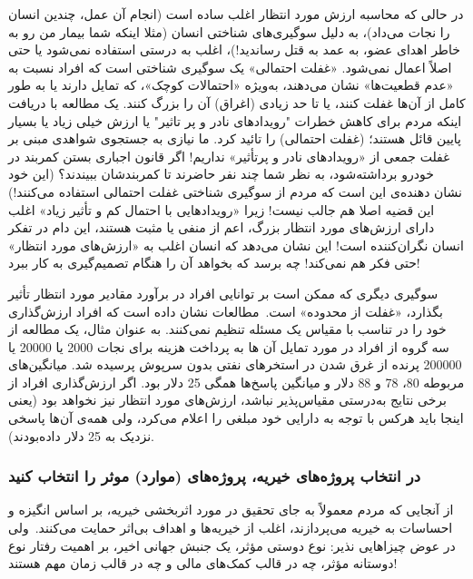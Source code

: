 در حالی که محاسبه ارزش مورد انتظار اغلب ساده است (انجام آن عمل، چندین انسان را نجات می‌داد)، به دلیل سوگیری‌های شناختی انسان (مثلا اینکه شما بیمار من رو به خاطر اهدای عضو، به عمد به قتل رساندید!)، اغلب به درستی استفاده نمی‌شود یا حتی اصلاً اعمال نمی‌شود.
«غفلت احتمالی» یک سوگیری شناختی است که افراد نسبت به «عدم قطعیت‌ها» نشان می‌دهند، به‌ویژه «احتمالات کوچک»، که تمایل دارند یا به طور کامل از آن‌ها غفلت کنند، یا تا حد زیادی (اغراق) آن را بزرگ کنند.
یک مطالعه با دریافت اینکه مردم برای کاهش خطرات "رویدادهای نادر و پر تاثیر" یا ارزش خیلی زیاد یا بسیار پایین قائل هستند؛ (غفلت احتمالی) را تائید کرد.
ما نیازی به جستجوی شواهدی مبنی بر غفلت جمعی از «رویدادهای نادر و پرتأثیر» نداریم!
اگر قانون اجباری بستن کمربند در خودرو برداشته‌شود، به نظر شما چند نفر حاضرند تا کمربندشان ببیندند؟ (این خود نشان دهنده‌ی این است که مردم از سوگیری شناختی غفلت احتمالی استفاده می‌کنند!) این قضیه اصلا هم جالب نیست!
زیرا «رویدادهایی با احتمال کم و تأثیر زیاد» اغلب دارای ارزش‌های مورد انتظار بزرگ، اعم از منفی یا مثبت هستند، این دام در تفکر انسان نگران‌کننده است!
این نشان می‌دهد که انسان اغلب به «ارزش‌های مورد انتظار» حتی فکر هم نمی‌کند!
چه برسد که بخواهد آن را هنگام تصمیم‌گیری به کار ببرد!

سوگیری دیگری که ممکن است بر توانایی افراد در برآورد مقادیر مورد انتظار تأثیر بگذارد، «غفلت از محدوده» است.\     مطالعات نشان داده است که افراد ارزش‌گذاری خود را در تناسب با مقیاس یک مسئله تنظیم نمی‌کنند.
به عنوان مثال، یک مطالعه از سه گروه از افراد در مورد تمایل آن ها به پرداخت هزینه برای نجات 2000 یا 20000 یا 200000 پرنده از غرق شدن در استخرهای نفتی بدون سرپوش پرسیده شد.
میانگین‌های مربوطه 80، 78 و 88 دلار و میانگین پاسخ‌ها همگی 25 دلار بود.
اگر ارزش‌گذاری افراد از برخی نتایج به‌درستی مقیاس‌پذیر نباشد، ارزش‌های مورد انتظار نیز نخواهد بود (یعنی اینجا باید هرکس با توجه به دارایی خود مبلغی را اعلام می‌کرد، ولی همه‌ی آن‌ها پاسخی نزدیک به 25 دلار داده‌بودند).
\newline
\newline

{
\subsubsection*{در انتخاب پروژه‌های خیریه، پروژه‌های (موارد) موثر را انتخاب کنید}
\label{subsubsec:در انتخاب پروژه‌های خیریه، پروژه‌های (موارد) موثر را انتخاب کنید}
از آنجایی که مردم معمولاً به جای تحقیق در مورد اثربخشی خیریه، بر اساس انگیزه و احساسات به خیریه می‌پردازند، اغلب از خیریه‌ها و اهداف بی‌اثر حمایت می‌کنند.\     ولی در عوض چیزاهایی نذیر: نوع دوستی مؤثر، یک جنبش جهانی اخیر، بر اهمیت رفتار نوع دوستانه مؤثر، چه در قالب کمک‌های مالی و چه در قالب زمان مهم هستند!
}

